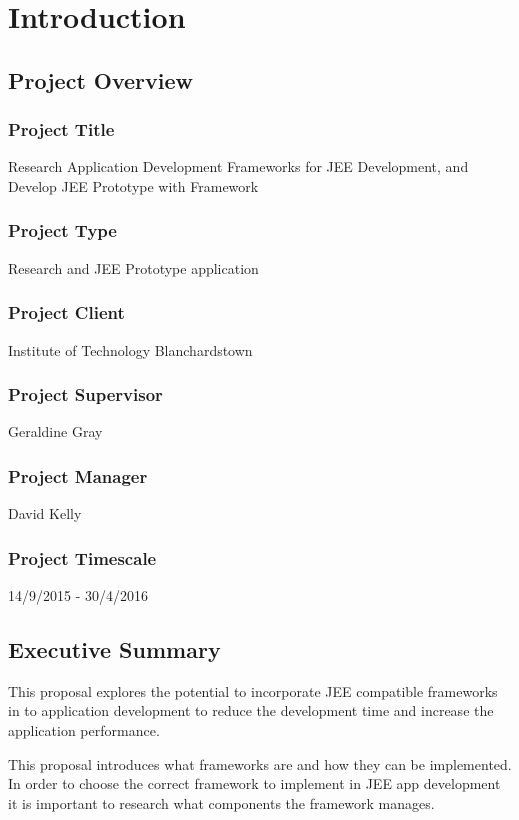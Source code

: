 \chapter*{Introduction}

\section{Project Overview}

\subsection{Project Title}
Research Application Development Frameworks for JEE Development, and Develop JEE Prototype with Framework

\subsection{Project Type}
Research and JEE Prototype application

\subsection{Project Client}
Institute of Technology Blanchardstown

\subsection{Project Supervisor}
Geraldine Gray

\subsection{Project Manager}
David Kelly

\subsection{Project Timescale}
14/9/2015 - 30/4/2016

\section{Executive Summary}
This proposal explores the potential to incorporate JEE compatible frameworks in to application development to reduce the development time and increase the application performance. 

This proposal introduces what frameworks are and how they can be implemented. In order to choose the correct framework to implement in JEE app development it is important to research what components the framework manages.

